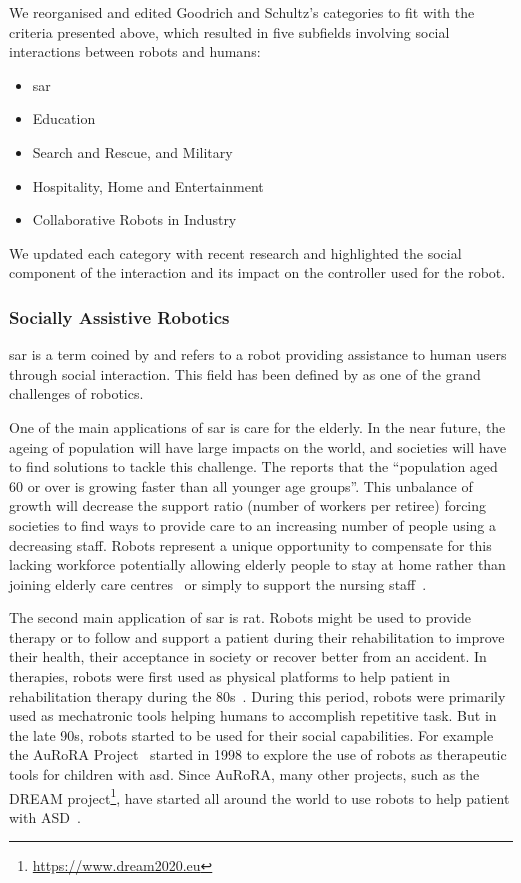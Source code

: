 We reorganised and edited Goodrich and Schultz's categories to fit with the criteria presented above, which resulted in five subfields involving social interactions between robots and humans: 
\begin{itemize}
	\item \acrfull{sar}
	\item Education
	\item Search and Rescue, and Military
	\item Hospitality, Home and Entertainment
	\item Collaborative Robots in Industry
\end{itemize}
We updated each category with recent research and highlighted the social component of the interaction and its impact on the controller used for the robot.

\subsubsection{Socially Assistive Robotics}

\gls{sar} is a term coined by \cite{feil2005defining} and refers to a robot providing assistance to human users through social interaction. This field has been defined by \cite{tapus2007socially} as one of the grand challenges of robotics.

One of the main applications of \gls{sar} is care for the elderly. In the near future, the ageing of population will have large impacts on the world, and societies will have to find solutions to tackle this challenge. The \cite{united2017world} reports that the ``population aged 60 or over is growing faster than all younger age groups''. This unbalance of growth will decrease the support ratio (number of workers per retiree) forcing societies to find ways to provide care to an increasing number of people using a decreasing staff. Robots represent a unique opportunity to compensate for this lacking workforce potentially allowing elderly people to stay at home rather than joining elderly care centres~\citep{di2014web} or simply to support the nursing staff~\citep{wada2004effects}.

The second main application of \gls{sar} is \gls{rat}. Robots might be used to provide therapy or to follow and support a patient during their rehabilitation to improve their health, their acceptance in society or recover better from an accident. In therapies, robots were first used as physical platforms to help patient in rehabilitation therapy during the 80s~\citep{harwin1988robot}. During this period, robots were primarily used as mechatronic tools helping humans to accomplish repetitive task. But in the late 90s, robots started to be used for their social capabilities. For example the AuRoRA Project~\citep{dautenhahn1999robots} started in 1998 to explore the use of robots as therapeutic tools for children with \gls{asd}. Since AuRoRA, many other projects, such as the DREAM project\footnote{\url{https://www.dream2020.eu}}, have started all around the world to use robots to help patient with ASD~\citep{diehl2012clinical,esteban2017build}. 

